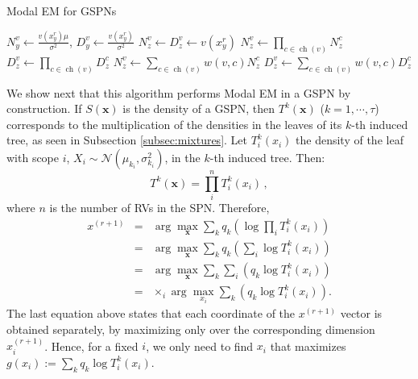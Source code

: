 \documentclass[12pt]{article}
\DeclareMathOperator*{\ch}{ch}
\begin{document}
\begin{algorithm}[h]
\caption{Modal EM for GSPNs}
\label{alg:mem}
\begin{algorithmic}
            \State $N^v_y \gets \frac{v(x^r_y)\mu}{\sigma^2}$,  $D^v_y \gets \frac{v(x^r_y)}{\sigma^2}$
                \State $N^v_z \gets D^v_z \gets v(x^r_y)$
            \EndFor
                \State $N^v_z \gets \prod_{c \in \ch(v)} N^c_z$
                \State $D^v_z \gets \prod_{c \in \ch(v)} D^c_z$
            \EndFor
                \State $N^v_z \gets \sum_{c \in \ch(v)} w(v, c) N^c_z$
                \State $D^v_z \gets \sum_{c \in \ch(v)} w(v, c) D^c_z$
            \EndFor
        \EndIf
    \EndFor
    \State {}
\end{algorithmic}
\end{algorithm}

We show next that this algorithm performs Modal EM in a GSPN by construction. 
If $S(\mathbf{x})$ is the density of a GSPN, then $T^k(\mathbf{x})$ ($k = 1, \cdots, \tau$) corresponds to the multiplication of the densities in the leaves of its $k$-th induced tree, as seen in Subsection \ref{subsec:mixtures}. Let $T^k_i(x_i)$ the density of the leaf with scope $i$, $X_i \sim \mathcal{N}(\mu_{k_i}, \sigma^2_{k_i})$, in the $k$-th induced tree. Then:
\begin{equation}
  T^k(\mathbf{x}) = \prod_i^n T^k_i(x_i) \, ,
\end{equation}
where $n$ is the number of RVs in the SPN. Therefore,
\begin{eqnarray}
  x^{(r+1)} & = & \arg\max_\mathbf{x} \sum_k q_k \left( \log{\prod_i T^k_i(x_i)} \right) \\
  & = & \arg\max_\mathbf{x} \sum_k q_k \left(\sum_i \log{T^k_i(x_i)} \right) \\
  & = & \arg\max_\mathbf{x} \sum_k \sum_i \left(q_k \log{T^k_i(x_i)} \right) \\
  & = & \times_i \arg\max_{x_i} \sum_k \left(q_k \log{T^k_i(x_i)} \right).
\end{eqnarray}
The last equation above states that each coordinate of the $x^{(r+1)}$ vector is obtained separately, by maximizing only over the corresponding dimension $x^{(r+1)}_i$.
Hence, for a fixed $i$, we only need to find $x_i$ that maximizes $g(x_i) := \sum_k q_k \log{T^k_i(x_i)}$.
\end{document}
